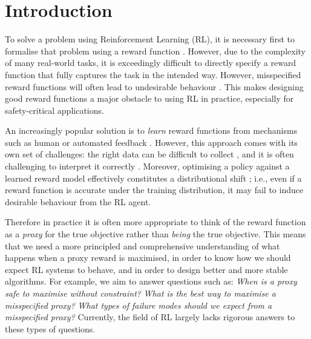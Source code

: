 \section{Introduction}

To solve a problem using Reinforcement Learning (RL), it is necessary first to formalise that problem using a reward function \citep{sutton2018}. 
However, due to the complexity of many real-world tasks, it is exceedingly difficult to directly specify a reward function that fully captures the task in the intended way.
However, misspecified reward functions will often lead to undesirable behaviour \citep{paulus2017deep, ibarz2018reward, knox2022reward, reward_misspecification}. This makes designing good reward functions a major obstacle to using RL in practice, especially for safety-critical applications.

An increasingly popular solution is to \emph{learn} reward functions from mechanisms such as human or automated feedback \cite[e.g.\ ][]{NIPS2017_d5e2c0ad, ng2000}.
However, this approach comes with its own set of challenges: 
the right data can be difficult to collect \cite[e.g.\ ][]{paulus2017deep}, and it is often challenging to interpret it correctly \cite[e.g.\ ][]{armstrong2019occams, skalse2023misspecification}.
Moreover, optimising a policy against a learned reward model effectively constitutes a distributional shift \citep{gao_scaling_2022}; i.e., even if a reward function is accurate under the training distribution, it may fail to induce desirable behaviour from the RL agent.

Therefore in practice it is often more appropriate to think of the reward function as a \emph{proxy} for the true objective rather than \emph{being} the true objective. %
This means that we need a more principled and comprehensive understanding of what happens when a proxy reward is maximised, in order to know how we should expect RL systems to behave, and in order to design better and more stable algorithms.
For example, we aim to answer questions such as: 
\emph{When is a proxy safe to maximise without constraint?} 
\emph{What is the best way to maximise a misspecified proxy?} 
\emph{What types of failure modes should we expect from a misspecified proxy?}
Currently, the field of RL largely lacks rigorous answers to these types of questions.


